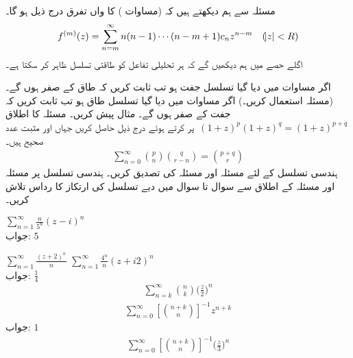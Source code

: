 مسئلہ   سے ہم دیکھتے ہیں کہ  (مساوات ) کا  واں تفرق  درج ذیل ہو گا۔
\begin{align}
f^{(m)}(z)=\sum\limits_{n=m}^{\infty} n(n-1)\cdots(n-m+1)c_nz^{n-m}\quad (\abs{z}<R)
\end{align}
اگلے حصے میں ہم دیکھیں گے کہ ہر تحلیلی تفاعل کو طاقتی تسلسل ظاہر کر سکتا ہے۔

\quad
اگر مساوات  میں دیا گیا تسلسل جفت ہو تب ثابت کریں کہ طاق  کے   صفر ہوں گے۔ (مسئلہ  استعمال کریں۔)
\quad
اگر مساوات  میں دیا گیا تسلسل طاق ہو تب ثابت کریں کہ جفت  کے   صفر ہوں گے۔ مثال پیش کریں۔
\quad
مسئلہ  کا اطلاق 
$\,(1+z)^p(1+z)^q=(1+z)^{p+q}\,$
پر کرتے ہوئے درج ذیل حاصل کریں جہاں  اور  مثبت عدد صحیح ہیں۔
\begin{align*}
\sum\limits_{n=0}^{\infty}
\binom{p}{n}\binom{q}{r-n}=\binom{p+q}{r}
\end{align*}
\quad 
ہندسی تسلسل کے لئے مسئلہ  اور مسئلہ  کی تصدیق کریں۔
ہندسی تسلسل پر مسئلہ  اور مسئلہ  کے اطلاق سے سوال  تا سوال  میں دیے تسلسل کی ارتکاز کا رداس تلاش کریں۔ 

\quad
$\sum\limits_{n=1}^{\infty}\tfrac{n}{5^n}(z-i)^n$\\
جواب:\quad
$5$

\quad
$\sum\limits_{n=1}^{\infty} \tfrac{(z+2)^n}{n}$
\quad
$\sum\limits_{n=1}^{\infty} \tfrac{4^n}{n}(z+i2)^n$\\
جواب:\quad
$\tfrac{1}{4}$
\quad
\begin{align*}
\sum\limits_{n=k}^{\infty}
\binom{n}{k}
\big(\frac{z}{2}\big)^n
\end{align*}
\quad
\begin{align*}
\sum\limits_{n=0}^{\infty}
\left[\binom{n+k}{n}\right]^{-1} z^{n+k}
\end{align*}
جواب:\quad 
$1$
\quad
\begin{align*}
\sum\limits_{n=0}^{\infty}
\left[\binom{ n+k}{n}\right]^{-1} \big(\frac{z}{3}\big)^n
\end{align*}

